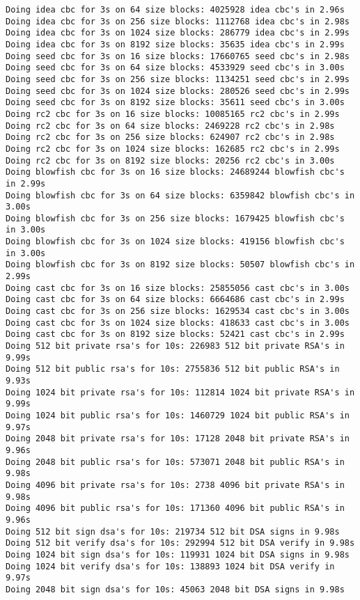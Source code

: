 \documentclass[%
 aip,
 jmp,%
 amsmath,amssymb,
 reprint,%
]{revtex4-1}
\begin{document}
\begin{verbatim}
Doing idea cbc for 3s on 64 size blocks: 4025928 idea cbc's in 2.96s
Doing idea cbc for 3s on 256 size blocks: 1112768 idea cbc's in 2.98s
Doing idea cbc for 3s on 1024 size blocks: 286779 idea cbc's in 2.99s
Doing idea cbc for 3s on 8192 size blocks: 35635 idea cbc's in 2.99s
Doing seed cbc for 3s on 16 size blocks: 17660765 seed cbc's in 2.98s
Doing seed cbc for 3s on 64 size blocks: 4533929 seed cbc's in 3.00s
Doing seed cbc for 3s on 256 size blocks: 1134251 seed cbc's in 2.99s
Doing seed cbc for 3s on 1024 size blocks: 280526 seed cbc's in 2.99s
Doing seed cbc for 3s on 8192 size blocks: 35611 seed cbc's in 3.00s
Doing rc2 cbc for 3s on 16 size blocks: 10085165 rc2 cbc's in 2.99s
Doing rc2 cbc for 3s on 64 size blocks: 2469228 rc2 cbc's in 2.98s
Doing rc2 cbc for 3s on 256 size blocks: 624907 rc2 cbc's in 2.98s
Doing rc2 cbc for 3s on 1024 size blocks: 162685 rc2 cbc's in 2.99s
Doing rc2 cbc for 3s on 8192 size blocks: 20256 rc2 cbc's in 3.00s
Doing blowfish cbc for 3s on 16 size blocks: 24689244 blowfish cbc's in 2.99s
Doing blowfish cbc for 3s on 64 size blocks: 6359842 blowfish cbc's in 3.00s
Doing blowfish cbc for 3s on 256 size blocks: 1679425 blowfish cbc's in 3.00s
Doing blowfish cbc for 3s on 1024 size blocks: 419156 blowfish cbc's in 3.00s
Doing blowfish cbc for 3s on 8192 size blocks: 50507 blowfish cbc's in 2.99s
Doing cast cbc for 3s on 16 size blocks: 25855056 cast cbc's in 3.00s
Doing cast cbc for 3s on 64 size blocks: 6664686 cast cbc's in 2.99s
Doing cast cbc for 3s on 256 size blocks: 1629534 cast cbc's in 3.00s
Doing cast cbc for 3s on 1024 size blocks: 418633 cast cbc's in 3.00s
Doing cast cbc for 3s on 8192 size blocks: 52421 cast cbc's in 2.99s
Doing 512 bit private rsa's for 10s: 226983 512 bit private RSA's in 9.99s
Doing 512 bit public rsa's for 10s: 2755836 512 bit public RSA's in 9.93s
Doing 1024 bit private rsa's for 10s: 112814 1024 bit private RSA's in 9.99s
Doing 1024 bit public rsa's for 10s: 1460729 1024 bit public RSA's in 9.97s
Doing 2048 bit private rsa's for 10s: 17128 2048 bit private RSA's in 9.96s
Doing 2048 bit public rsa's for 10s: 573071 2048 bit public RSA's in 9.98s
Doing 4096 bit private rsa's for 10s: 2738 4096 bit private RSA's in 9.98s
Doing 4096 bit public rsa's for 10s: 171360 4096 bit public RSA's in 9.96s
Doing 512 bit sign dsa's for 10s: 219734 512 bit DSA signs in 9.98s
Doing 512 bit verify dsa's for 10s: 292994 512 bit DSA verify in 9.98s
Doing 1024 bit sign dsa's for 10s: 119931 1024 bit DSA signs in 9.98s
Doing 1024 bit verify dsa's for 10s: 138893 1024 bit DSA verify in 9.97s
Doing 2048 bit sign dsa's for 10s: 45063 2048 bit DSA signs in 9.98s

\end{verbatim}
\end{document}
